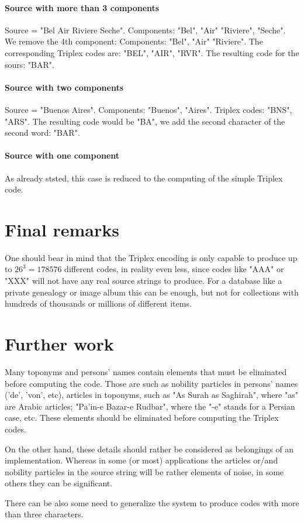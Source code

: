 \documentclass[12pt,a4paper]{article}
\begin{document}
	\paragraph{Source with more than 3 components\\}
	Source = "Bel Air Riviere Seche". Components: "Bel", "Air" "Riviere", "Seche". We remove the 4th component: 
	Components: "Bel", "Air" "Riviere". The corresponding Triplex codes are: "BEL", "AIR", "RVR". The resulting code for the sours: "BAR".
	
	\paragraph{Source with two components\\}
	Source = "Buenos Aires". Components: "Buenos", "Aires". Triplex codes: "BNS", "ARS". The resulting code would be "BA", we add the second character of the second word: "BAR".
	
	\paragraph{Source with one component\\}
	As already ststed, this case is reduced to the computing of the simple Triplex code.
	
\section{Final remarks}	
One should bear in mind that the Triplex encoding is only capable to produce up to $26^3 = 178576$ different codes, in reality even less, since codes like "AAA" or "XXX" will not have any real source strings to produce. For a database like a private genealogy or image album this can be enough, but not for collections with hundreds of thousands or millions of different items.
	
\section{Further work}
Many toponyms and persons' names contain elements that must be eliminated before computing the code. Those are such as nobility particles in persons' names ('de', 'von', etc), articles in toponyms, such as "As Surah as Saghirah", where "as" are Arabic articles; "Pa'in-e Bazar-e Rudbar", where the "-e" stands for a Persian case, etc. These elements should be eliminated before computing the Triplex codes.

On the other hand, these details should rather be considered as belongings of an implementation. Whereas in some (or most) applications the articles or/and nobility particles in the source string will be rather elements of noise, in some others they can be significant. 

There can be also some need to generalize the system to produce codes with more than three characters. 


\end{document}
